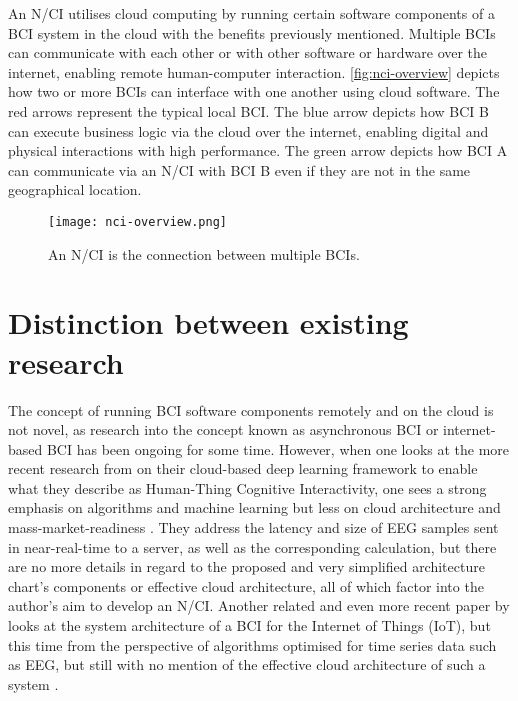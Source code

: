 An N/CI utilises cloud computing by running certain software components of a BCI system in the cloud with the benefits previously mentioned. Multiple BCIs can communicate with each other or with other software or hardware over the internet, enabling remote human-computer interaction. \autoref{fig:nci-overview} depicts how two or more BCIs can interface with one another using cloud software. The red arrows represent the typical local BCI. The blue arrow depicts how BCI B can execute business logic via the cloud over the internet, enabling digital and physical interactions with high performance. The green arrow depicts how BCI A can communicate via an N/CI with BCI B even if they are not in the same geographical location.

\begin{figure}[ht]
  \centering
  \texttt{[image: nci-overview.png]}
  \caption{An N/CI is the connection between multiple BCIs.}
  \label{fig:nci-overview}
\end{figure}

\section*{Distinction between existing research}
\label{appendix1-distinction-between-existing-research}

The concept of running BCI software components remotely and on the cloud is not novel, as research into the concept known as asynchronous BCI \citep{an_design_2016} or internet-based BCI \citep{lampe_brain-computer_2014} has been ongoing for some time. However, when one looks at the more recent research from  \citeauthor{zhang_internet_2018} \parencite*{zhang_internet_2018} on their cloud-based deep learning framework to enable what they describe as Human-Thing Cognitive Interactivity, one sees a strong emphasis on algorithms and machine learning but less on cloud architecture and mass-market-readiness \citep{zhang_internet_2018}. They address the latency and size of EEG samples sent in near-real-time to a server, as well as the corresponding calculation, but there are no more details in regard to the proposed and very simplified architecture chart’s components or effective cloud architecture, all of which factor into the author’s aim to develop an N/CI. Another related and even more recent paper by \citeauthor{ahamad_system_2022} \parencite*{ahamad_system_2022} looks at the system architecture of a BCI for the Internet of Things (IoT), but this time from the perspective of algorithms optimised for time series data such as EEG, but still with no mention of the effective cloud architecture of such a system \citep{ahamad_system_2022}.

